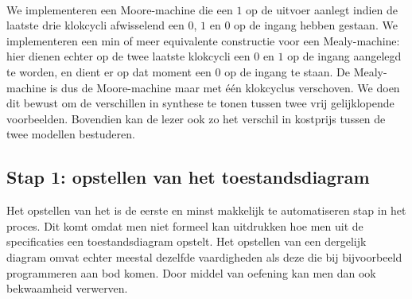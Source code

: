 \paragraph{}
We implementeren een Moore-machine die een $1$ op de uitvoer aanlegt indien de laatste drie klokcycli afwisselend een $0$, $1$ en $0$ op de ingang hebben gestaan. We implementeren een min of meer equivalente constructie voor een Mealy-machine: hier dienen echter op de twee laatste klokcycli een $0$ en $1$ op de ingang aangelegd te worden, en dient er op dat moment een $0$ op de ingang te staan. De Mealy-machine is dus de Moore-machine maar met \'e\'en klokcyclus verschoven. We doen dit bewust om de verschillen in synthese te tonen tussen twee vrij gelijklopende voorbeelden. Bovendien kan de lezer ook zo het verschil in kostprijs tussen de twee modellen bestuderen.

\subsection{Stap 1: opstellen van het toestandsdiagram}
Het opstellen van het  is de eerste en minst makkelijk te automatiseren stap in het proces. Dit komt omdat men niet formeel kan uitdrukken hoe men uit de specificaties een toestandsdiagram opstelt. Het opstellen van een dergelijk diagram omvat echter meestal dezelfde vaardigheden als deze die bij bijvoorbeeld programmeren aan bod komen. Door middel van oefening kan men dan ook bekwaamheid verwerven.

